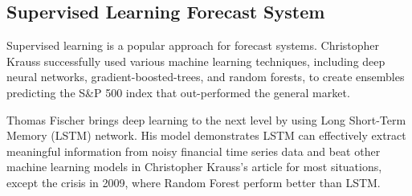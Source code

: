 \subsection{Supervised Learning Forecast System}
Supervised learning is a popular approach for forecast systems. Christopher Krauss successfully used various machine learning techniques, including deep neural networks, gradient-boosted-trees, and random forests, to create ensembles predicting the S\&P 500 index that out-performed the general market\cite{KRAUSS2017689}.
\par

Thomas Fischer brings deep learning to the next level by using Long Short-Term Memory (LSTM) network\cite{FISCHER2018654}. His model demonstrates LSTM can effectively extract meaningful information from noisy financial time series data and beat other machine learning models in Christopher Krauss's article\cite{KRAUSS2017689} for most situations, except the crisis in 2009, where Random Forest perform better than LSTM.